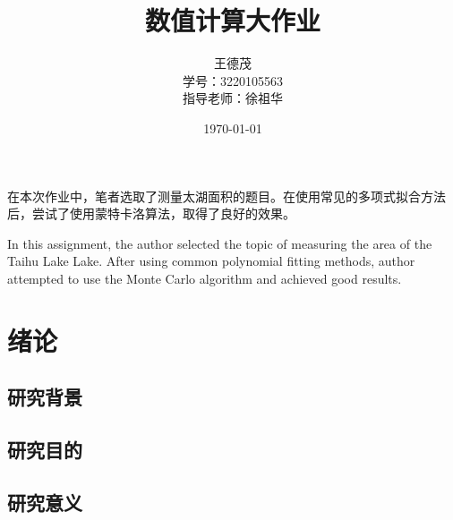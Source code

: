 \documentclass[a4paper,12pt]{article}
\begin{document}
\title {数值计算大作业}
\author{王德茂  \\学号：3220105563  \\
指导老师：徐祖华}

\date{\today}
\maketitle

\renewcommand{\abstractname}{\textbf{\zihao{4}摘\quad 要}}
\begin{onecolabstract}
  在本次作业中，笔者选取了测量太湖面积的题目。在使用常见的多项式拟合方法后，尝试了使用蒙特卡洛算法，取得了良好的效果。

  

\end{onecolabstract}
\renewcommand{\abstractname}{\textbf{Abstract}}
\begin{onecolabstract}
    In this assignment, the author selected the topic of measuring the area of the 
    Taihu Lake Lake. After using common polynomial fitting methods, 
    author attempted to use the Monte Carlo algorithm and achieved good results.

\end{onecolabstract}
\newpage
\begin{center}
  \tableofcontents
\end{center}


\newpage
{}

\section{绪论}
\subsection{研究背景}



\subsection{研究目的}

\subsection{研究意义}
\end{document}
